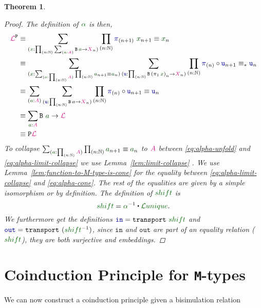 \documentclass[twoside,11pt,openright]{report}
\theoremstyle{plain} %
\newtheorem{thm}{Theorem}[section]
\theoremstyle{definition}
\theoremstyle{remark}
\newcommand*{\lemref}[1]{Lemma~\ref{lem:#1}}
\newcommand*{\term}[1]{\textcolor{green!30!black}{#1}} %
\newcommand*{\pathterm}[1]{\textcolor{green!40!black}{#1}}
\newcommand*{\type}[1]{\textcolor{magenta!90!black}{#1}}
\newcommand*{\function}[1]{\textcolor{blue!60!black}{\ensuremath{\mathtt{#1}}}}
\newcommand*{\typeformer}[1]{\ensuremath{\mathtt{#1}}}
\newcommand*{\functor}[1]{\ensuremath{\mathbf{\mathtt{#1}}}}
\newcommand{\ct}{%
  \mathchoice{\mathbin{\raisebox{0.5ex}{$\displaystyle\centerdot$}}}%
             {\mathbin{\raisebox{0.5ex}{$\centerdot$}}}%
             {\mathbin{\raisebox{0.25ex}{$\scriptstyle\,\centerdot\,$}}}%
             {\mathbin{\raisebox{0.1ex}{$\scriptscriptstyle\,\centerdot\,$}}}
}
\newcommand*{\sym}[1]{\ensuremath{#1^{-1}}}
\begin{document}
\begin{thm}
\begin{proof}
    The definition of \(\pathterm{\alpha}\) is then, 
    \begin{align}
      \type{\mathcal{L}}^{\functor{P}} &\equiv \sum_{(\term{x} : \prod_{(n : \mathbb{N})} \sum_{(\term{a} : \type{A})} \typeformer{B}\,\term{a} \rightarrow \type{X}_n)} \prod_{(n : \mathbb{N})} \function{\pi}_{(n+1)}~\term{x}_{n+1} \equiv \term{x}_{n} \\
      &\equiv \sum_{(\term{x} : \sum_{(\term{a} : \prod_{(n : \mathbb{N})} \type{A})} \prod_{(n : \mathbb{N})} \term{a}_{n+1} \equiv \term{a}_n)} \sum_{(\function{u} : \prod_{(n : \mathbb{N})} \typeformer{B}\,{(\pi_1\,\term{x})}_n \rightarrow \type{X}_n)} \prod_{(n : \mathbb{N})} \function{\pi}_{(n)} \circ \function{u}_{n+1} \equiv_* \function{u}_n \label{eq:alpha-unfold} \\
      &\equiv \sum_{(\term{a} : \type{A})} \sum_{(\function{u} : \prod_{(n : \mathbb{N})} \typeformer{B}\,a \rightarrow \type{X}_n)} \prod_{(n : \mathbb{N})} \function{\pi}_{(n)} \circ \function{u}_{n+1} \equiv \function{u}_n \label{eq:alpha-limit-collapse} \\
      &\equiv \sum_{\term{a} : \type{A}} \typeformer{B}~\term{a} \rightarrow \type{\mathcal{L}} \label{eq:alpha-cone}\\
      &\equiv \functor{P}\type{\mathcal{L}}
    \end{align}
    To collapse \(\sum_{(\term{a} : \prod_{(n : \mathbb{N})} \type{A})} \prod_{(n : \mathbb{N})} \term{a}_{n+1} \equiv \term{a}_n\) to \(\type{A}\) between \eqref{eq:alpha-unfold} and \eqref{eq:alpha-limit-collapse} we use \lemref{limit-collapse} . We use \lemref{function-to-M-type-is-cone} for the equality between \eqref{eq:alpha-limit-collapse} and \eqref{eq:alpha-cone}. The rest of the equalities are given by a simple isomorphism or by definition. The definition of \(\pathterm{shift}\) is
    \begin{equation}
      \pathterm{shift} = \sym{\pathterm{\alpha}} \ct \pathterm{\mathcal{L}unique}.
    \end{equation}
    We furthermore get the definitions \(\function{in} = \mathtt{transport}~\pathterm{shift}\) and \(\function{out} = \mathtt{transport}~(\sym{\pathterm{shift}})\), since \function{in} and \function{out} are part of an equality relation (\(\pathterm{shift}\)), they are both surjective and embeddings.
    \end{proof}
\end{thm}

\section{Coinduction Principle for \texttt{M}-types}
We can now construct a coinduction principle given a bisimulation relation
\end{document}
